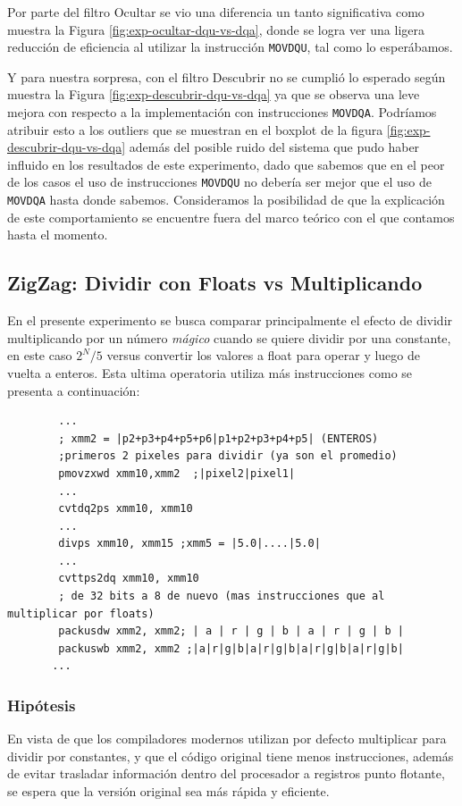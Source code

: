 \documentclass[a4paper]{article}
\newenvironment{codesnippet}{%
	\begin{Sbox}\begin{minipage}{\textwidth}\sffamily\small}%
	{\end{minipage}\end{Sbox}%
		\begin{center}%
		\vspace{-0.4cm}\colorbox{litegrey}{\TheSbox}\end{center}\vspace{0.3cm}}
\begin{document}
Por parte del filtro Ocultar se vio una diferencia un tanto significativa como muestra la Figura \ref{fig:exp-ocultar-dqu-vs-dqa}, donde se logra ver una ligera reducción de eficiencia al utilizar la instrucción \texttt{MOVDQU}, tal como lo esperábamos.

Y para nuestra sorpresa, con el filtro Descubrir no se cumplió lo esperado según muestra la Figura \ref{fig:exp-descubrir-dqu-vs-dqa} ya que se observa una leve mejora con respecto a la implementación con instrucciones \texttt{MOVDQA}. Podríamos atribuir esto a los outliers que se muestran en el boxplot de la figura \ref{fig:exp-descubrir-dqu-vs-dqa} además del posible ruido del sistema que pudo haber influido en los resultados de este experimento, dado que sabemos que en el peor de los casos el uso de instrucciones \texttt{MOVDQU} no debería ser mejor que el uso de \texttt{MOVDQA} hasta donde sabemos. Consideramos la posibilidad de que la explicación de este comportamiento se encuentre fuera del marco teórico con el que contamos hasta el momento.

\subsection{ZigZag: Dividir con Floats vs Multiplicando}

En el presente experimento se busca comparar principalmente el efecto de dividir multiplicando por un número \emph{mágico} cuando se quiere dividir por una constante, en este caso $2^N/5$ versus convertir los valores a float para operar y luego de vuelta a enteros. Esta ultima operatoria utiliza más instrucciones como se presenta a continuación: 

\begin{codesnippet}
\begin{verbatim}
        ...
        ; xmm2 = |p2+p3+p4+p5+p6|p1+p2+p3+p4+p5| (ENTEROS)
        ;primeros 2 pixeles para dividir (ya son el promedio)
        pmovzxwd xmm10,xmm2  ;|pixel2|pixel1|
        ...
        cvtdq2ps xmm10, xmm10       
        ... 
        divps xmm10, xmm15 ;xmm5 = |5.0|....|5.0|
        ...
        cvttps2dq xmm10, xmm10
        ; de 32 bits a 8 de nuevo (mas instrucciones que al multiplicar por floats)  
        packusdw xmm2, xmm2; | a | r | g | b | a | r | g | b |
        packuswb xmm2, xmm2 ;|a|r|g|b|a|r|g|b|a|r|g|b|a|r|g|b|
       ...
\end{verbatim}
\end{codesnippet}

\subsubsection{Hipótesis}
En vista de que los compiladores modernos utilizan por defecto multiplicar para dividir por constantes, y que el código original tiene menos instrucciones, además de evitar trasladar información dentro del procesador a registros punto flotante, se espera que la versión original sea más rápida y eficiente.
\end{document}
